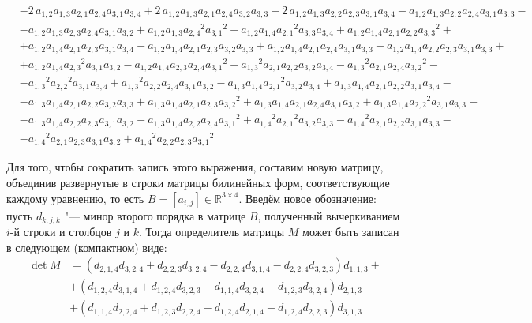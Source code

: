 \begin{equation}
\begin{aligned}
        &- 2\,a_{{1,2}}a_{{1,3}}a_{{2,1}}a_{{2,4}}a_{{3,1}}a_{{3,4}} + 2\,a_{{1,2}}a_{{1,3}}a_{{2,1}}a_{{2,4}}a_{{3,2}}a_{{3,3}} + 2\,a_{{1,2}}a_{{1,3}}a_{{2,2}}a_{{2,3}}a_{{3,1}}a_{{3,4}} - a_{{1,2}}a_{{1,3}}a_{{2,2}}a_{{2,4}}a_{{3,1}}a_{{3,3}} - \\
        &- a_{{1,2}}a_{{1,3}}a_{{2,3}}a_{{2,4}}a_{{3,1}}a_{{3,2}} + a_{{1,2}}a_{{1,3}}{a_{{2,4}}}^{2}{a_{{3,1}}}^{2} - a_{{1,2}}a_{{1,4}}{a_{{2,1}}}^{2}a_{{3,3}}a_{{3,4}} + a_{{1,2}}a_{{1,4}}a_{{2,1}}a_{{2,2}}{a_{{3,3}}}^{2} + \\ 
        &+ a_{{1,2}}a_{{1,4}}a_{{2,1}}a_{{2,3}}a_{{3,1}}a_{{3,4}} - a_{{1,2}}a_{{1,4}}a_{{2,1}}a_{{2,3}}a_{{3,2}}a_{{3,3}} + a_{{1,2}}a_{{1,4}}a_{{2,1}}a_{{2,4}}a_{{3,1}}a_{{3,3}} - a_{{1,2}}a_{{1,4}}a_{{2,2}}a_{{2,3}}a_{{3,1}}a_{{3,3}} + \\ 
        &+ a_{{1,2}}a_{{1,4}}{a_{{2,3}}}^{2}a_{{3,1}}a_{{3,2}} - a_{{1,2}}a_{{1,4}}a_{{2,3}}a_{{2,4}}{a_{{3,1}}}^{2} + {a_{{1,3}}}^{2}a_{{2,1}}a_{{2,2}}a_{{3,2}}a_{{3,4}} - {a_{{1,3}}}^{2}a_{{2,1}}a_{{2,4}}{a_{{3,2}}}^{2} -\\ 
        &- {a_{{1,3}}}^{2}{a_{{2,2}}}^{2}a_{{3,1}}a_{{3,4}} + {a_{{1,3}}}^{2}a_{{2,2}}a_{{2,4}}a_{{3,1}}a_{{3,2}} - a_{{1,3}}a_{{1,4}}{a_{{2,1}}}^{2}a_{{3,2}}a_{{3,4}} + a_{{1,3}}a_{{1,4}}a_{{2,1}}a_{{2,2}}a_{{3,1}}a_{{3,4}} - \\ 
        &- a_{{1,3}}a_{{1,4}}a_{{2,1}}a_{{2,2}}a_{{3,2}}a_{{3,3}} + a_{{1,3}}a_{{1,4}}a_{{2,1}}a_{{2,3}}{a_{{3,2}}}^{2} + a_{{1,3}}a_{{1,4}}a_{{2,1}}a_{{2,4}}a_{{3,1}}a_{{3,2}} + a_{{1,3}}a_{{1,4}}{a_{{2,2}}}^{2}a_{{3,1}}a_{{3,3}} - \\ 
        &- a_{{1,3}}a_{{1,4}}a_{{2,2}}a_{{2,3}}a_{{3,1}}a_{{3,2}} - a_{{1,3}}a_{{1,4}}a_{{2,2}}a_{{2,4}}{a_{{3,1}}}^{2} + {a_{{1,4}}}^{2}{a_{{2,1}}}^{2}a_{{3,2}}a_{{3,3}} - {a_{{1,4}}}^{2}a_{{2,1}}a_{{2,2}}a_{{3,1}}a_{{3,3}} - \\ 
        &- {a_{{1,4}}}^{2}a_{{2,1}}a_{{2,3}}a_{{3,1}}a_{{3,2}} + {a_{{1,4}}}^{2}a_{{2,2}}a_{{2,3}}{a_{{3,1}}}^{2}
\end{aligned}
\end{equation}

Для того, чтобы сократить запись этого выражения, составим новую матрицу, объединив развернутые в строки матрицы билинейных форм, соответствующие каждому уравнению, то есть $B = [a_{i, j}] \in \mathbb{R}^{3 \times 4}$. Введём новое обозначение: пусть $d_{k, j, k}$ "--- минор второго порядка в матрице $B$, полученный вычеркиванием $i$-й строки и столбцов $j$ и $k$. Тогда определитель матрицы $M$ может быть записан в следующем (компактном) виде: 
$$
	\begin{aligned}
	\det M & = (d_{2,1,4} d_{3,2,4} + d_{2,2,3} d_{3,2,4} - d_{2,2,4} d_{3,1,4} - 
		 	d_{2,2,4} d_{3,2,3}) d_{1,1,3} + \\
		 	& + (d_{1,2,4} d_{3,1,4} + d_{1,2,4} d_{3,2,3} - d_{1,1,4} d_{3,2,4} - d_{1,2,3}
		 	d_{3,2,4}) d_{2,1,3} + \\		 
		 	& + (d_{1,1,4} d_{2,2,4} + d_{1,2,3}d_{2,2,4} - d_{1,2,4}d_{2,1,4} - d_{1,2,4}
		 	d_{2,2,3}) d_{3,1,3}
	\end{aligned}
$$

